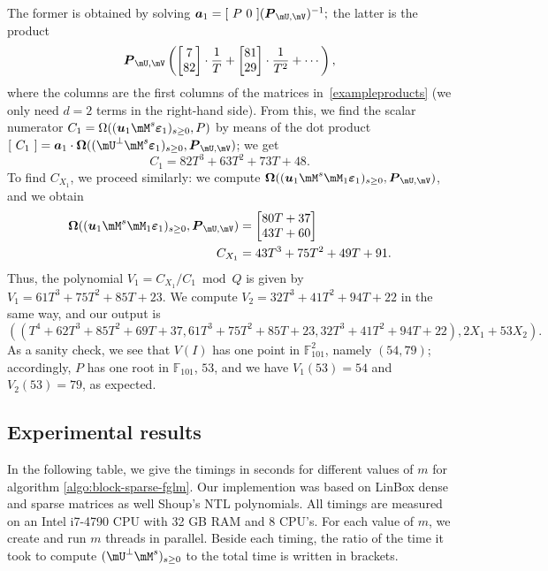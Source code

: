 \documentclass[12pt]{article}
\newcommand{\mat}[1]{\bm{\MakeUppercase{#1}}} %
\newcommand{\row}[1]{\bm{\MakeLowercase{#1}}} %
\newcommand{\col}[1]{\bm{\MakeLowercase{#1}}} %
\newcommand{\minpoly}{P}
\def\F {\ensuremath{\mathbb{F}}}
\begin{document}
The former is obtained by solving $\row{a}_1 = [~P~0~] (\mat{P}_{\mU,\mV})^{-1};$
the latter is the product
$$\mat{P}_{\mU,\mV} 
\left (
\begin{bmatrix}
7\\  
82
\end{bmatrix}\cdot \frac 1T+
\begin{bmatrix}
81\\  
29
\end{bmatrix}\cdot \frac 1{T^2}+
 \cdots \right),$$ where the columns are the first columns of the
 matrices in~\eqref{exampleproducts} (we only need $d=2$
 terms in the right-hand side).  From this, we find the scalar
 numerator $C_1 = \Omega((\row{u}_1 \mM^s\col{\varepsilon}_1)_{s \ge
   0}, \minpoly)$ by means of the dot product $[~C_1~] = \row{a}_1\cdot
 \mat{\Omega}( (\mU^\perp \mM^s\col{\varepsilon}_1)_{s \ge 0},
 \mat{P}_{\mU,\mV})$; we get
$$ C_1 = 82T^3 + 63T^2 + 73T + 48.$$
To find $C_{X_1}$, we proceed similarly: we compute  $\mat{\Omega}( (\row{u}_1 \mM^s \mM_1\col{\varepsilon}_1)_{s \ge 0}, \mat{P}_{\mU,\mV})$,
and we obtain
\begin{align*}
\mat{\Omega}( (\row{u}_1 \mM^s \mM_1\col{\varepsilon}_1)_{s \ge 0}, \mat{P}_{\mU,\mV}) &=
\left [\begin{matrix} 80T + 37 \\ 43T+60
  \end{matrix} \right  ]\\
C_{X_1} &= 43T^3 + 75T^2  + 49T+91.
\end{align*}
Thus, the polynomial $V_1 = C_{X_1}/C_1 \bmod Q$ is 
given by $V_1= 61T^3 + 75T^2 + 85T + 23$. 
We compute $V_2= 32T^3 + 41T^2 + 94T + 22$ in the same way,
and our output is 
$$((T^4 + 62T^3 + 85T^2 + 69T + 37, 61T^3 + 75T^2 + 85T + 23, 32T^3 +
41T^2 + 94T + 22), 2X_1 + 53 X_2).$$ As a sanity check, we see that
$V(I)$ has one point in $\F_{101}^2$, namely $(54,79)$;
accordingly, $P$ has one root
in $\F_{101}$, $53$, and we have $V_1(53) = 54$ and $V_2(53) = 79$, as
expected.


\subsection{Experimental results}\label{section:ex}

In the following table, we give the timings in seconds for different
values of $m$ for algorithm \ref{algo:block-sparse-fglm}.  Our
implemention was based on LinBox \cite{LinBox} dense and sparse
matrices as well Shoup's NTL \cite{NTL} polynomials. All timings are
measured on an Intel i7-4790 CPU with 32 GB RAM and 8 CPU's. For each
value of $m$, we create and run $m$ threads in parallel. Beside each
timing, the ratio of the time it took to compute $(\mU^{\perp}
\mM^s)_{s\ge0}$ to the total time is written in brackets.
\end{document}
